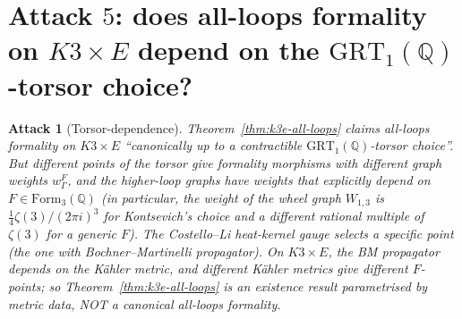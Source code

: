 \documentclass[11pt]{article}
\newtheorem{attack}[theorem]{Attack}
\providecommand{\QQ}{\mathbb{Q}}
\providecommand{\GRT}{\mathrm{GRT}}
\providecommand{\Form}{\mathrm{Form}}
\begin{document}
\section{Attack $5$:  does all-loops formality on $K3 \times E$ depend
on the $\GRT_1(\QQ)$-torsor choice?}
\label{sec:attack-5-grt}

\begin{attack}[Torsor-dependence]
\label{att:torsor-dependence}
Theorem~\ref{thm:k3e-all-loops} claims all-loops formality on
$K3 \times E$ ``canonically up to a contractible $\GRT_1(\QQ)$-torsor
choice''.  But different points of the torsor give formality
morphisms with different graph weights $w_\Gamma^F$, and the
higher-loop graphs have weights that explicitly depend on
$F \in \Form_3(\QQ)$ (in particular, the weight of the wheel graph
$W_{1,3}$ is $\frac{1}{4}\zeta(3)/(2\pi i)^3$ for Kontsevich's choice
and a different rational multiple of $\zeta(3)$ for a generic
$F$).  The Costello--Li heat-kernel gauge selects a specific point
(the one with Bochner--Martinelli propagator).  On $K3 \times E$,
the BM propagator depends on the K\"ahler metric, and different
K\"ahler metrics give different $F$-points;  so Theorem~\ref{thm:k3e-all-loops}
is an existence result parametrised by metric data, NOT a
canonical all-loops formality.
\end{attack}
\end{document}
